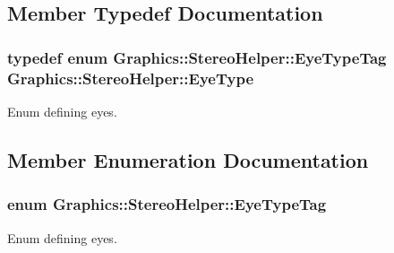 \subsection{Member Typedef Documentation}
\hypertarget{class_graphics_1_1_stereo_helper_a29cdc9bdc1c46342adb6e0b06d6ee49a}{
\subsubsection[{EyeType}]{\setlength{\rightskip}{0pt plus 5cm}typedef enum {\bf Graphics::StereoHelper::EyeTypeTag}  {\bf Graphics::StereoHelper::EyeType}}}
\label{class_graphics_1_1_stereo_helper_a29cdc9bdc1c46342adb6e0b06d6ee49a}


Enum defining eyes. 



\subsection{Member Enumeration Documentation}
\hypertarget{class_graphics_1_1_stereo_helper_a3878d00d8c9d23837a978e28f2602917}{
\subsubsection[{EyeTypeTag}]{\setlength{\rightskip}{0pt plus 5cm}enum {\bf Graphics::StereoHelper::EyeTypeTag}}}
\label{class_graphics_1_1_stereo_helper_a3878d00d8c9d23837a978e28f2602917}


Enum defining eyes. 

